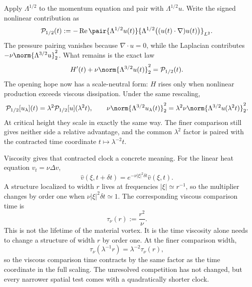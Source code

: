 
Apply \(\Lambda^{1/2}\) to the momentum equation and pair with \(\Lambda^{1/2}u\). Write the signed nonlinear contribution as
\[
  \mathcal P_{1/2}(t)
  :=
  -\operatorname{Re}
  \pair
    {\Lambda^{1/2}u(t)}
    {\Lambda^{1/2}\bigl((u(t)\cdot\nabla)u(t)\bigr)}_{L^2}.
\]
The pressure pairing vanishes because \(\nabla\cdot u=0\), while the Laplacian contributes \(-\nu\norm{\Lambda^{3/2}u}_2^2\). What remains is the exact law
\[
  H'(t)
  +
  \nu\norm{\Lambda^{3/2}u(t)}_2^2
  =
  \mathcal P_{1/2}(t).
\]
The opening hope now has a scale-neutral form: \(H\) rises only when nonlinear production exceeds viscous dissipation. Under the same rescaling,
\[
  \mathcal P_{1/2}[u_\lambda](t)
  =
  \lambda^2\mathcal P_{1/2}[u](\lambda^2t),
  \qquad
  \nu\norm{\Lambda^{3/2}u_\lambda(t)}_2^2
  =
  \lambda^2\nu\norm{\Lambda^{3/2}u(\lambda^2t)}_2^2.
\]
At critical height they scale in exactly the same way. The finer comparison still gives neither side a relative advantage, and the common \(\lambda^2\) factor is paired with the contracted time coordinate \(t\mapsto\lambda^{-2}t\).


Viscosity gives that contracted clock a concrete meaning. For the linear heat equation \(v_t=\nu\Delta v\),
\[
  \widehat v(\xi,t+\delta t)
  =
  e^{-\nu|\xi|^2\delta t}\widehat v(\xi,t).
\]
A structure localized to width \(r\) lives at frequencies \(|\xi|\simeq r^{-1}\), so the multiplier changes by order one when \(\nu|\xi|^2\delta t\simeq1\). The corresponding viscous comparison time is
\[
  \tau_\nu(r)
  :=
  \frac{r^2}{\nu}.
\]
This is not the lifetime of the material vortex. It is the time viscosity alone needs to change a structure of width \(r\) by order one. At the finer comparison width,
\[
  \tau_\nu(\lambda^{-1}r)
  =
  \lambda^{-2}\tau_\nu(r),
\]
so the viscous comparison time contracts by the same factor as the time coordinate in the full \NavierStokes{} scaling. The unresolved competition has not changed, but every narrower spatial test comes with a quadratically shorter clock.


